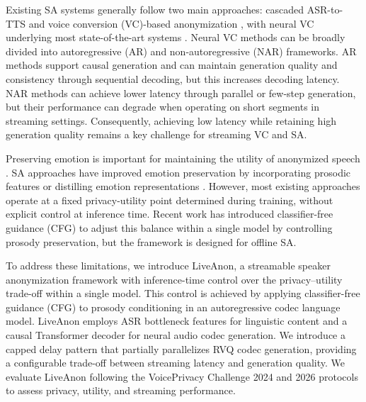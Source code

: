 \documentclass{article}
\begin{document}
Existing SA systems generally follow two main approaches: cascaded ASR-to-TTS \cite{meyer2023anonymizing} and voice conversion (VC)-based anonymization \cite{panariello2024speaker, yao2024npu, huang2024diffvc+}, with neural VC underlying most state-of-the-art systems \cite{miao2026voiceprivacy}. 
Neural VC methods can be broadly divided into autoregressive (AR) and non-autoregressive (NAR) frameworks. 
AR methods \cite{wang2024streamvoice, wang2024streamvoice+, kuzmin2026stream} support causal generation and can maintain generation quality and consistency through sequential decoding, but this increases decoding latency.
NAR methods \cite{ning2024dualvc, ma2026meanvc} can achieve lower latency through parallel or few-step generation, but their performance can degrade when operating on short segments in streaming settings.
Consequently, achieving low latency while retaining high generation quality remains a key challenge for streaming VC and SA.

Preserving emotion is important for maintaining the utility of anonymized speech \cite{tomashenko2024voiceprivacy}.
SA approaches have improved emotion preservation by incorporating prosodic features \cite{meyer2023prosody, franzreb2025private, he2025emotion} or distilling emotion representations \cite{yao2025easy, kuzmin2026streamvoiceanon+}.
However, most existing approaches operate at a fixed privacy-utility point determined during training, without explicit control at inference time.
Recent work \cite{ulgen2026diffanon} has introduced classifier-free guidance (CFG) to adjust this balance within a single model by controlling prosody preservation, but the framework is designed for offline SA.

To address these limitations, we introduce LiveAnon, a streamable speaker anonymization framework with inference-time control over the privacy--utility trade-off within a single model.
This control is achieved by applying classifier-free guidance (CFG) to prosody conditioning in an autoregressive codec language model.
LiveAnon employs ASR bottleneck features for linguistic content and a causal Transformer decoder for neural audio codec generation.
We introduce a capped delay pattern that partially parallelizes RVQ codec generation, providing a configurable trade-off between streaming latency and generation quality.
We evaluate LiveAnon following the VoicePrivacy Challenge 2024 and 2026 protocols to assess privacy, utility, and streaming performance.
\end{document}
